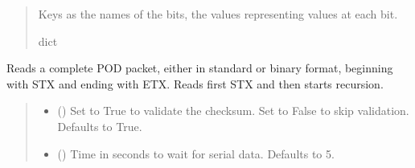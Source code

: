 \documentclass[letterpaper,10pt,english]{sphinxmanual}
\begin{document}
\begin{fulllineitems}
\begin{fulllineitems}
\begin{quote}
\begin{description}
\sphinxAtStartPar
Keys as the names of the bits, the values representing values at each bit.

\sphinxAtStartPar
dict

\end{description}\end{quote}

\end{fulllineitems}


\begin{fulllineitems}
\label{\detokenize{Morelia.Devices:Morelia.Devices.PodDevice_8480SC.Pod8480SC.ReadPODpacket}}
\pysigstartsignatures
{}
\pysigstopsignatures
\sphinxAtStartPar
Reads a complete POD packet, either in standard or binary format, beginning with STX and         ending with ETX. Reads first STX and then starts recursion.
\begin{quote}\begin{description}
\begin{itemize}
\item {} 
\sphinxAtStartPar
{} (\sphinxstyleliteralemphasis{\sphinxupquote{, }}) \textendash{} Set to True to validate the checksum. Set to False to                 skip validation. Defaults to True.

\item {} 
\sphinxAtStartPar
{} (\sphinxstyleliteralemphasis{\sphinxupquote{|}}\sphinxstyleliteralemphasis{\sphinxupquote{, }}) \textendash{} Time in seconds to wait for serial data.                 Defaults to 5.


\end{itemize}
\end{description}
\end{quote}
\end{fulllineitems}
\end{fulllineitems}
\end{document}

